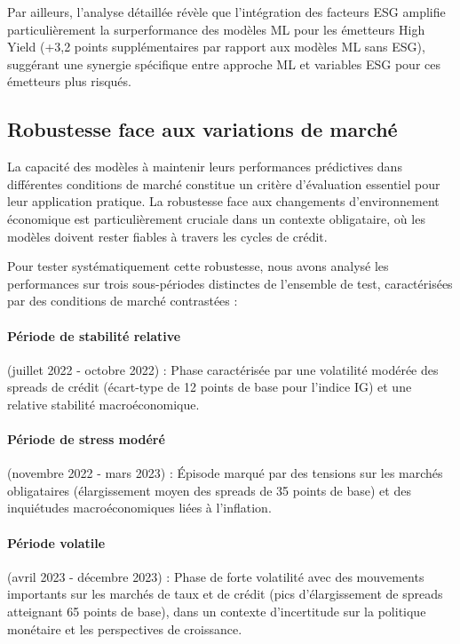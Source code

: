 Par ailleurs, l'analyse détaillée révèle que l'intégration des facteurs ESG amplifie particulièrement la surperformance des modèles ML pour les émetteurs High Yield (+3,2 points supplémentaires par rapport aux modèles ML sans ESG), suggérant une synergie spécifique entre approche ML et variables ESG pour ces émetteurs plus risqués.

\subsection{Robustesse face aux variations de marché}

La capacité des modèles à maintenir leurs performances prédictives dans différentes conditions de marché constitue un critère d'évaluation essentiel pour leur application pratique. La robustesse face aux changements d'environnement économique est particulièrement cruciale dans un contexte obligataire, où les modèles doivent rester fiables à travers les cycles de crédit.

Pour tester systématiquement cette robustesse, nous avons analysé les performances sur trois sous-périodes distinctes de l'ensemble de test, caractérisées par des conditions de marché contrastées :

\paragraph{Période de stabilité relative} (juillet 2022 - octobre 2022) : Phase caractérisée par une volatilité modérée des spreads de crédit (écart-type de 12 points de base pour l'indice IG) et une relative stabilité macroéconomique.

\paragraph{Période de stress modéré} (novembre 2022 - mars 2023) : Épisode marqué par des tensions sur les marchés obligataires (élargissement moyen des spreads de 35 points de base) et des inquiétudes macroéconomiques liées à l'inflation.

\paragraph{Période volatile} (avril 2023 - décembre 2023) : Phase de forte volatilité avec des mouvements importants sur les marchés de taux et de crédit (pics d'élargissement de spreads atteignant 65 points de base), dans un contexte d'incertitude sur la politique monétaire et les perspectives de croissance.

